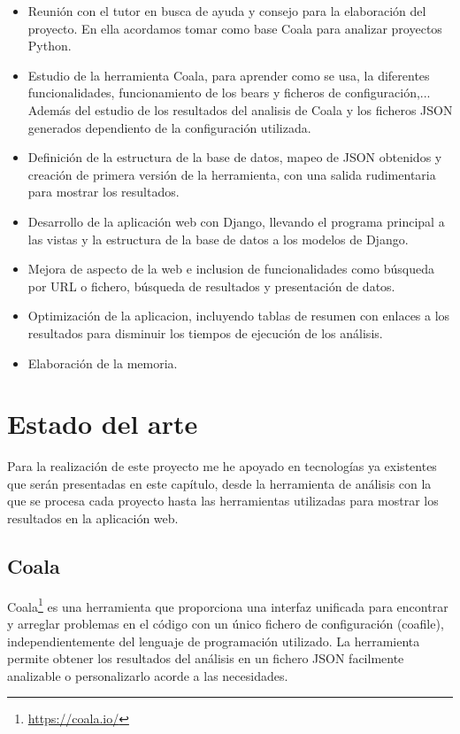 \documentclass[a4paper, 12pt]{book}
\begin{document}
\begin{itemize}
  \item Reunión con el tutor en busca de ayuda y consejo para la elaboración del proyecto. En ella acordamos tomar como base Coala para analizar proyectos Python.
  \item Estudio de la herramienta Coala, para aprender como se usa, la diferentes funcionalidades, funcionamiento de los bears y ficheros de configuración,... Además del estudio de los resultados del analisis de Coala y los ficheros JSON generados dependiento de la configuración utilizada.
  \item Definición de la estructura de la base de datos, mapeo de JSON obtenidos y creación de primera versión de la herramienta, con una salida rudimentaria para mostrar los resultados.
  \item Desarrollo de la aplicación web con Django, llevando el programa principal a las vistas y la estructura de la base de datos a los modelos de Django.
  \item Mejora de aspecto de la web e inclusion de funcionalidades como búsqueda por URL o fichero, búsqueda de resultados y presentación de datos.
  \item Optimización de la aplicacion, incluyendo tablas de resumen con enlaces a los resultados para disminuir los tiempos de ejecución de los análisis.
  \item Elaboración de la memoria.
\end{itemize}



\cleardoublepage
\chapter{Estado del arte}
Para la realización de este proyecto me he apoyado en tecnologías ya existentes que serán presentadas en este capítulo, desde la herramienta de análisis con la que se procesa cada proyecto hasta las herramientas utilizadas para mostrar los resultados en la aplicación web.

\section{Coala} 
\label{sec:seccion1}
Coala\footnote{\url{https://coala.io/}} es una herramienta que proporciona una interfaz unificada para encontrar y arreglar problemas en el código con un único fichero de configuración (coafile), independientemente del lenguaje de programación utilizado. La herramienta permite obtener los resultados del análisis en un fichero JSON facilmente analizable o personalizarlo acorde a las necesidades.
\end{document}
